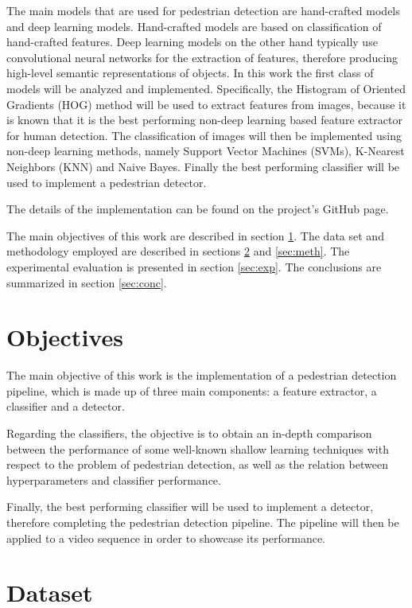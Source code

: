\documentclass[journal,twocolumn]{IEEEtran}
\begin{document}
The main models that are used for pedestrian detection are
hand-crafted models and deep learning models. Hand-crafted
models are based on classification of hand-crafted features. Deep learning models on the other hand typically use
convolutional neural networks for the extraction of features,
therefore producing high-level semantic representations of
objects.
In this work the first class of models will be analyzed
and implemented. Specifically, the Histogram of Oriented
Gradients (HOG) method will be used to extract features from
images, because it is known\cite{2} that it is the best performing non-deep learning based feature extractor for human detection. The classification of images will then be implemented
using non-deep learning methods, namely Support Vector
Machines (SVMs), K-Nearest Neighbors (KNN) and Naive Bayes. Finally the best performing classifier will be used
to implement a pedestrian detector.

The details of the implementation can be found on the project's GitHub page\cite{4}.

The main objectives of this work are described in section
\ref{sec:obj}. The data set and methodology employed are described in
sections \ref{sec:data} and \ref{sec:meth}. The experimental evaluation is presented
in section \ref{sec:exp}. The conclusions are summarized in section \ref{sec:conc}.

\section{Objectives}
\label{sec:obj}
The main objective of this work is the implementation of
a pedestrian detection pipeline, which is made up
of three main components: a feature extractor, a classifier and a
detector.

Regarding the classifiers, the objective is to obtain an in-depth comparison between the performance of some well-known shallow learning techniques with respect to the problem of pedestrian detection, as well as the relation between hyperparameters and classifier performance.

Finally, the best performing classifier will be used to implement a detector, therefore completing the pedestrian detection pipeline. The pipeline will then be applied to a video sequence in order to showcase its performance.

\section{Dataset}
\label{sec:data}
\end{document}

